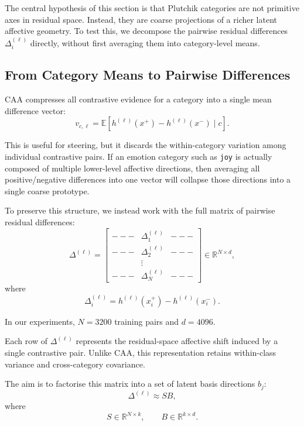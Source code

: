\documentclass[12pt,twoside]{report}
\begin{document}
The central hypothesis of this section is that Plutchik categories are not primitive axes in residual space. Instead, they are coarse projections of a richer latent affective geometry. To test this, we decompose the pairwise residual differences $\Delta_i^{(\ell)}$ directly, without first
averaging them into category-level means.

\subsection{From Category Means to Pairwise Differences}

CAA compresses all contrastive evidence for a category into a single mean difference vector:
\begin{equation}
v_{c,\ell}
=
\mathbb{E}
\left[
h^{(\ell)}(x^+) - h^{(\ell)}(x^-)
\mid c
\right].
\end{equation}

This is useful for steering, but it discards the within-category
variation among individual contrastive pairs. If an emotion category such as \texttt{joy} is actually composed of multiple lower-level affective directions, then averaging all positive/negative differences into one vector will collapse those directions into a single coarse prototype.

To preserve this structure, we instead work with the full matrix of pairwise residual differences:
\begin{equation}
\Delta^{(\ell)}
=
\begin{bmatrix}
--- & \Delta_1^{(\ell)} & --- \\
--- & \Delta_2^{(\ell)} & --- \\
& \vdots & \\
--- & \Delta_N^{(\ell)} & ---
\end{bmatrix}
\in \mathbb{R}^{N\times d},
\end{equation}
where
\begin{equation}
\Delta_i^{(\ell)}
=
h^{(\ell)}(x_i^+)
-
h^{(\ell)}(x_i^-).
\end{equation}

In our experiments, $N=3200$ training pairs and $d=4096$. 

Each row of $\Delta^{(\ell)}$ represents the residual-space affective shift induced by a single contrastive pair. Unlike CAA, this representation retains within-class variance and cross-category covariance.

The aim is to factorise this matrix into a set of latent basis directions
$b_j$:
\begin{equation}
\Delta^{(\ell)}
\approx
S B,
\end{equation}
where
\begin{equation}
S\in\mathbb{R}^{N\times k},
\qquad
B\in\mathbb{R}^{k\times d}.
\end{equation}
\end{document}
